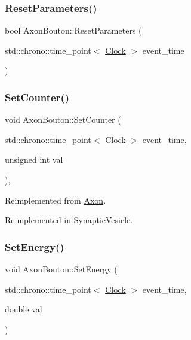 \mbox{\label{classAxonBouton_a73d3721361c4e1ce6b110ffe1b4a7a88}} 
\subsubsection{\texorpdfstring{Reset\+Parameters()}{ResetParameters()}}
{\footnotesize\ttfamily bool Axon\+Bouton\+::\+Reset\+Parameters (\begin{DoxyParamCaption}\item[{std\+::chrono\+::time\+\_\+point$<$ \mbox{\hyperlink{universe_8h_a0ef8d951d1ca5ab3cfaf7ab4c7a6fd80}{Clock}} $>$}]{event\+\_\+time }\end{DoxyParamCaption})}

\mbox{\label{classAxonBouton_afe285478d414f2815afb98abe7b92898}} 
\subsubsection{\texorpdfstring{Set\+Counter()}{SetCounter()}}
{\footnotesize\ttfamily void Axon\+Bouton\+::\+Set\+Counter (\begin{DoxyParamCaption}\item[{std\+::chrono\+::time\+\_\+point$<$ \mbox{\hyperlink{universe_8h_a0ef8d951d1ca5ab3cfaf7ab4c7a6fd80}{Clock}} $>$}]{event\+\_\+time,  }\item[{unsigned int}]{val }\end{DoxyParamCaption})\hspace{0.3cm}{\ttfamily [inline]}, {\ttfamily [virtual]}}



Reimplemented from \mbox{\hyperlink{classAxon_a3493cb97bde26bd66facc6084cd5f219}{Axon}}.



Reimplemented in \mbox{\hyperlink{classSynapticVesicle_a7fd7cfce5eccb904206d968866f85220}{Synaptic\+Vesicle}}.

\mbox{\label{classAxonBouton_ab24fa467ab7221d0577e54734684a491}} 
\subsubsection{\texorpdfstring{Set\+Energy()}{SetEnergy()}}
{\footnotesize\ttfamily void Axon\+Bouton\+::\+Set\+Energy (\begin{DoxyParamCaption}\item[{std\+::chrono\+::time\+\_\+point$<$ \mbox{\hyperlink{universe_8h_a0ef8d951d1ca5ab3cfaf7ab4c7a6fd80}{Clock}} $>$}]{event\+\_\+time,  }\item[{double}]{val }\end{DoxyParamCaption})\hspace{0.3cm}{\ttfamily [inline]}}


